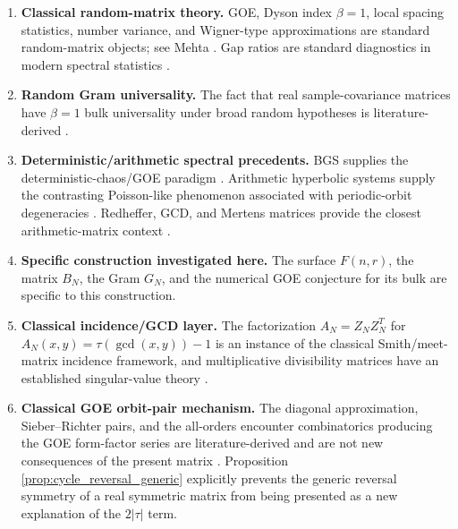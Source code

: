 \documentclass[11pt]{amsart}
\numberwithin{equation}{section}
\theoremstyle{plain}
\theoremstyle{definition}
\theoremstyle{remark}
\begin{document}
\begin{enumerate}[label=(\roman*)]
\item \textbf{Classical random-matrix theory.}  GOE, Dyson index $\beta=1$, local spacing statistics, number variance, and Wigner-type approximations are standard random-matrix objects; see Mehta \cite{Mehta2004}.  Gap ratios are standard diagnostics in modern spectral statistics \cite{OganesyanHuse2007,Atas2013}.

\item \textbf{Random Gram universality.}  The fact that real sample-covariance matrices have $\beta=1$ bulk universality under broad random hypotheses is literature-derived \cite{TaoVu2012,PillaiYin2014}.

\item \textbf{Deterministic/arithmetic spectral precedents.}  BGS supplies the deterministic-chaos/GOE paradigm \cite{BGS1984}.  Arithmetic hyperbolic systems supply the contrasting Poisson-like phenomenon associated with periodic-orbit degeneracies \cite{BogomolnyEtAl1992,LuoSarnak1994}.  Redheffer, GCD, and Mertens matrices provide the closest arithmetic-matrix context \cite{BarrettJarvis1992,HongLoewy2004,Cardinal2010,ClementSteinerberger2025,Kline2019,Kline2020}.

\item \textbf{Specific construction investigated here.}  The surface $F(n,r)$, the matrix $B_N$, the Gram $G_N$, and the numerical GOE conjecture for its bulk are specific to this construction.

\item \textbf{Classical incidence/GCD layer.}
The factorization $A_N=Z_NZ_N^T$ for $A_N(x,y)=\tau(\gcd(x,y))-1$ is an instance of the classical Smith/meet-matrix incidence framework, and multiplicative divisibility matrices have an established singular-value theory \cite{HaukkanenWangSillanpaa1997,KorkeeHaukkanen2003,Hilberdink2017}.
\item \textbf{Classical GOE orbit-pair mechanism.}
The diagonal approximation, Sieber--Richter pairs, and the all-orders encounter combinatorics producing the GOE form-factor series are literature-derived and are not new consequences of the present matrix \cite{Berry1985,SieberRichter2001,MullerEtAl2004,MullerEtAl2005}.  Proposition \ref{prop:cycle_reversal_generic} explicitly prevents the generic reversal symmetry of a real symmetric matrix from being presented as a new explanation of the $2|\tau|$ term.


\end{enumerate}
\end{document}
